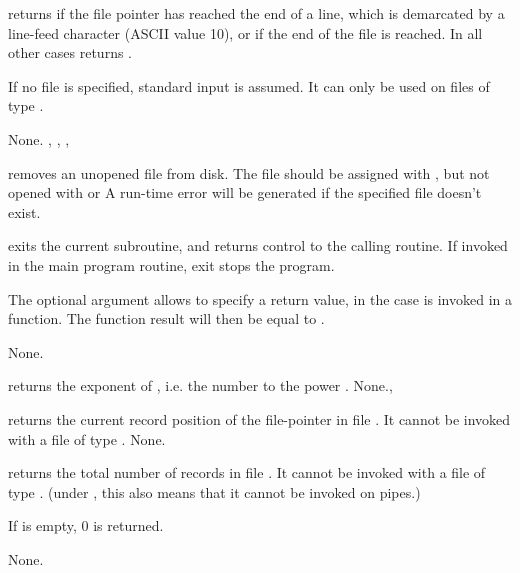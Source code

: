 \documentclass{report}
\begin{document}


{ returns  if the file pointer has reached the end of a
line, which is demarcated by a line-feed character (ASCII value 10), or if
the end of the file is reached.
In all other cases  returns .

If no file  is specified, standard input is assumed.
It can only be used on files of type .}
{None.}
{, , , }



{ removes an unopened file from disk. The file should be
assigned with , but not opened with  or }
{A run-time error will be generated if the specified file doesn't exist.}
{}



{ exits the current subroutine, and returns control to the calling
routine. If invoked in the main program routine, exit stops the program.

The optional argument  allows to specify a return value, in the case
 is invoked in a function. The function result will then be
equal to .}
{None.}
{}



{ returns the exponent of , i.e. the number  to the
power .}
{None.}{, }



{ returns the current record position of the file-pointer in file
. It cannot be invoked with a file of type .}
{None.}
{}



{ returns the total number of records in file . 
It cannot be invoked with a file of type . (under \linux, this
also means that it cannot be invoked on pipes.)

If  is empty, 0 is returned.
}
{None.}
{}


\end{document}
